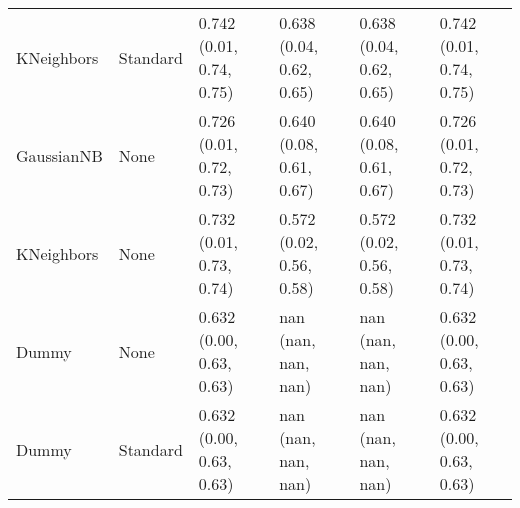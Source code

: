 \begin{tabular}{llllll}
KNeighbors & Standard & 0.742 (0.01, 0.74, 0.75) & 0.638 (0.04, 0.62, 0.65) & 0.638 (0.04, 0.62, 0.65) & 0.742 (0.01, 0.74, 0.75) \\
GaussianNB & None & 0.726 (0.01, 0.72, 0.73) & 0.640 (0.08, 0.61, 0.67) & 0.640 (0.08, 0.61, 0.67) & 0.726 (0.01, 0.72, 0.73) \\
KNeighbors & None & 0.732 (0.01, 0.73, 0.74) & 0.572 (0.02, 0.56, 0.58) & 0.572 (0.02, 0.56, 0.58) & 0.732 (0.01, 0.73, 0.74) \\
Dummy & None & 0.632 (0.00, 0.63, 0.63) & nan (nan, nan, nan) & nan (nan, nan, nan) & 0.632 (0.00, 0.63, 0.63) \\
Dummy & Standard & 0.632 (0.00, 0.63, 0.63) & nan (nan, nan, nan) & nan (nan, nan, nan) & 0.632 (0.00, 0.63, 0.63) \\
\bottomrule
\end{tabular}
